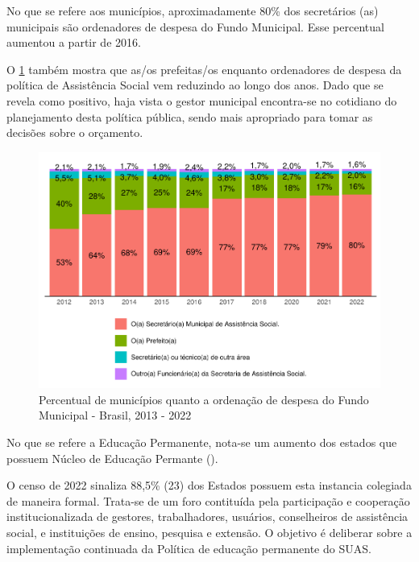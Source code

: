 \documentclass[
  brazilian]{report}
\begin{document}
No que se refere aos municípios, aproximadamente 80\% dos secretários
(as) municipais são ordenadores de despesa do Fundo Municipal. Esse
percentual aumentou a partir de 2016.

O \cref{fig:munic_ord_despesa} também mostra que as/os prefeitas/os
enquanto ordenadores de despesa da política de Assistência Social vem
reduzindo ao longo dos anos. Dado que se revela como positivo, haja
vista o gestor municipal encontra-se no cotidiano do planejamento desta
política pública, sendo mais apropriado para tomar as decisões sobre o
orçamento.

\begin{figure}
\includegraphics{Censo-SUAS-2022_files/figure-latex/munic_ord_despesa-1} \caption[Percentual de municípios quanto a ordenação de despesa do Fundo Municipal - Brasil, 2013 - 2022]{Percentual de municípios quanto a ordenação de despesa do Fundo Municipal - Brasil, 2013 - 2022}\label{fig:munic_ord_despesa}
\end{figure}

No que se refere a Educação Permanente, nota-se um aumento dos estados
que possuem Núcleo de Educação Permante ().

O censo de 2022 sinaliza 88,5\% (23) dos Estados possuem esta instancia
colegiada de maneira formal. Trata-se de um foro contituída pela
participação e cooperação institucionalizada de gestores, trabalhadores,
usuários, conselheiros de assistência social, e instituições de ensino,
pesquisa e extensão. O objetivo é deliberar sobre a implementação
continuada da Política de educação permanente do SUAS.
\end{document}
